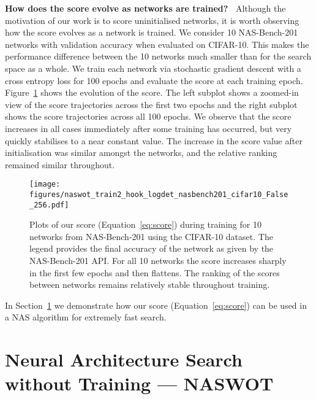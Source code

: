\documentclass{article}
\begin{document}
\textbf{How does the score evolve as networks are trained?\ } Although the motivation of our work is to score uninitialised networks, it is worth observing how the score evolves as a network is trained. 
We consider 10 NAS-Bench-201 networks with  validation accuracy when evaluated on CIFAR-10. This makes the performance difference between the 10 networks much smaller than for the search space as a whole. 
We train each network via stochastic gradient descent with a cross entropy loss for 100 epochs and evaluate the score at each training epoch. Figure~\ref{fig:scoretraj} shows the evolution of the score. The left subplot shows a zoomed-in view of the score trajectories across the first two epochs and the right subplot shows the score trajectories across all 100 epochs. 
We observe that the score increases in all cases immediately after some training has occurred, but very quickly stabilises to a near constant value. The increase in the score value after initialisation was similar amongst the networks, and the relative ranking remained similar throughout. 


\begin{figure}[!h]
                \texttt{[image: figures/naswot\_train2\_hook\_logdet\_nasbench201\_cifar10\_False\_256.pdf]}
\caption{Plots of our score (Equation~\ref{eq:score}) during training for 10 networks from NAS-Bench-201 using the CIFAR-10 dataset. The legend provides the final accuracy of the network as given by the NAS-Bench-201 API. For all 10 networks the score increases sharply in the first few epochs and then flattens. The ranking of the scores between networks remains relatively stable throughout training.}
\label{fig:scoretraj}
\end{figure}

In Section~\ref{sec:nas} we demonstrate how our score (Equation~\ref{eq:score}) can be used in a NAS algorithm for extremely fast search.





\section{Neural Architecture Search without Training --- NASWOT}
\label{sec:nas}
\end{document}
